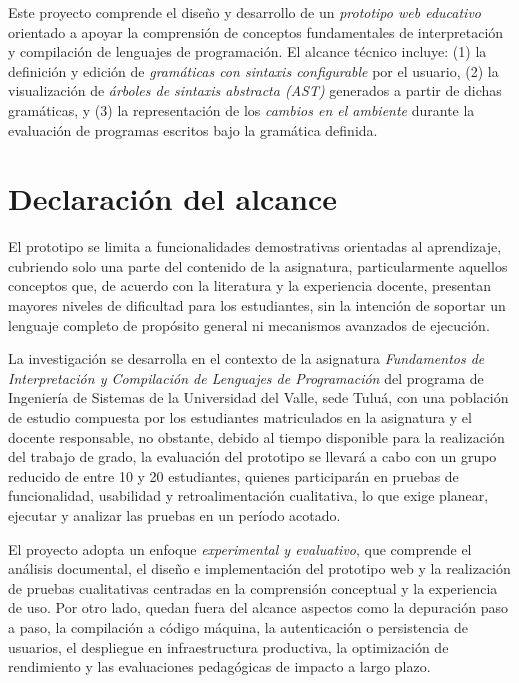 Este proyecto comprende el diseño y desarrollo de un \textit{prototipo web educativo} orientado a apoyar la comprensión de conceptos fundamentales de interpretación y compilación de lenguajes de programación. El alcance técnico incluye: (1) la definición y edición de \textit{gramáticas con sintaxis configurable} por el usuario, (2) la visualización de \textit{árboles de sintaxis abstracta (AST)} generados a partir de dichas gramáticas, y (3) la representación de los \textit{cambios en el ambiente} durante la evaluación de programas escritos bajo la gramática definida.

\section{Declaración del alcance}

El prototipo se limita a funcionalidades demostrativas orientadas al aprendizaje, cubriendo solo una parte del contenido de la asignatura, particularmente aquellos conceptos que, de acuerdo con la literatura y la experiencia docente, presentan mayores niveles de dificultad para los estudiantes, sin la intención de soportar un lenguaje completo de propósito general ni mecanismos avanzados de ejecución.

La investigación se desarrolla en el contexto de la asignatura \textit{Fundamentos de Interpretación y Compilación de Lenguajes de Programación} del programa de Ingeniería de Sistemas de la Universidad del Valle, sede Tuluá, con una población de estudio compuesta por los estudiantes matriculados en la asignatura y el docente responsable, no obstante, debido al tiempo disponible para la realización del trabajo de grado, la evaluación del prototipo se llevará a cabo con un grupo reducido de entre 10 y 20 estudiantes, quienes participarán en pruebas de funcionalidad, usabilidad y retroalimentación cualitativa, lo que exige planear, ejecutar y analizar las pruebas en un período acotado.

El proyecto adopta un enfoque \textit{experimental y evaluativo}, que comprende el análisis documental, el diseño e implementación del prototipo web y la realización de pruebas cualitativas centradas en la comprensión conceptual y la experiencia de uso. Por otro lado, quedan fuera del alcance aspectos como la depuración paso a paso, la compilación a código máquina, la autenticación o persistencia de usuarios, el despliegue en infraestructura productiva, la optimización de rendimiento y las evaluaciones pedagógicas de impacto a largo plazo.


